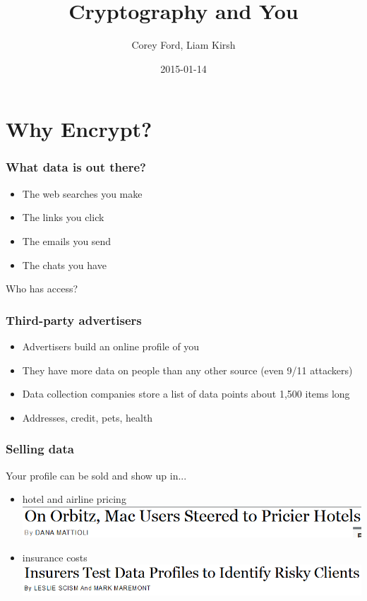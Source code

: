 \documentclass{beamer}
\title{Cryptography and You}
\author{Corey Ford, Liam Kirsh}
\institute{The White Hat}
\date{2015-01-14}
\begin{document}
\frame{\titlepage}

\section{Why Encrypt?}

\begin{frame}
  \frametitle{What data is out there?}

  \begin{itemize}
    \item The web searches you make
    \item The links you click
    \item The emails you send
    \item The chats you have
  \end{itemize}
  
  Who has access?

\end{frame}

\begin{frame}
  \frametitle{Third-party advertisers}
  
  \begin{itemize}
    \item Advertisers build an online profile of you
    \item They have more data on people than any other source (even 9/11 attackers)
    \item Data collection companies store a list of data points about 1,500 items long
    \item Addresses, credit, pets, health
  \end{itemize}

\end{frame}

\begin{frame}
  \frametitle{Selling data}
  
  Your profile can be sold and show up in...
  
  \begin{itemize}
    \item hotel and airline pricing
    \includegraphics[width=.8\textwidth]{orbitz_prices}
    \item insurance costs
    \includegraphics[width=.8\textwidth]{insurance_profiles}
  \end{itemize}
  

\end{frame}
\end{document}

